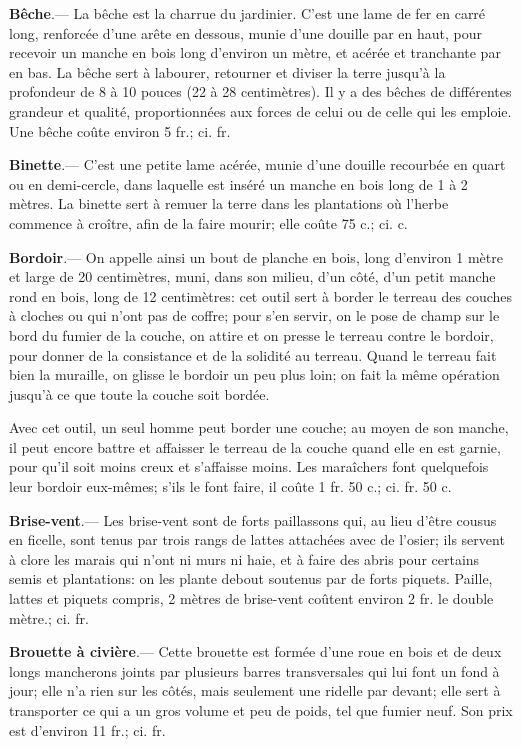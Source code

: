 \documentclass[10pt,a4paper]{book}
\begin{document}
\textbf{Bêche}.--- La bêche est la charrue du jardinier. C'est une lame de fer en carré long, renforcée d'une arête en dessous, munie d'une douille par en haut, pour recevoir un manche en bois long d'environ un mètre, et acérée et tranchante par en bas. La bêche sert à labourer, retourner et diviser la terre jusqu'à la profondeur de 8 à 10 pouces (22 à 28 centimètres). Il y a des bêches de différentes grandeur et qualité, proportionnées aux forces de celui ou de celle qui les emploie. Une bêche coûte environ 5 fr.; ci. fr.

\textbf{Binette}.--- C'est une petite lame acérée, munie d'une douille recourbée en quart ou en demi-cercle, dans laquelle est inséré un manche en bois long de 1 à 2 mètres. La binette sert à remuer la terre dans les plantations où l'herbe commence à croître, afin de la faire mourir; elle coûte 75 c.; ci. c.

\textbf{Bordoir}.--- On appelle ainsi un bout de planche en bois, long d'environ 1 mètre et large de 20 centimètres, muni, dans son milieu, d'un côté, d'un petit manche rond en bois, long de 12 centimètres: cet outil sert à border le terreau des couches à cloches ou qui n'ont pas de coffre; pour s'en servir, on le pose de champ sur le bord du fumier de la couche, on attire et on presse le terreau contre le bordoir, pour donner de la consistance et de la solidité au terreau. Quand le terreau fait bien la muraille, on glisse le bordoir un peu plus loin; on fait la même opération jusqu'à ce que toute la couche soit bordée.

Avec cet outil, un seul homme peut border une couche; au moyen de son manche, il peut encore battre et affaisser le terreau de la couche quand elle en est garnie, pour qu'il soit moins creux et s'affaisse moins. Les maraîchers font quelquefois leur bordoir eux-mêmes; s'ils le font faire, il coûte 1 fr. 50 c.; ci.  fr. 50 c.

\textbf{Brise-vent}.--- Les brise-vent sont de forts paillassons qui, au lieu d'être cousus en ficelle, sont tenus par trois rangs de lattes attachées avec de l'osier; ils servent à clore les marais qui n'ont ni murs ni haie, et à faire des abris pour certains semis et plantations: on les plante debout soutenus par de forts piquets. Paille, lattes et piquets compris, 2 mètres de brise-vent coûtent environ 2 fr. le double mètre.; ci. fr.

\textbf{Brouette à civière}.--- Cette brouette est formée d'une roue en bois et de deux longs mancherons joints par plusieurs barres transversales qui lui font un fond à jour; elle n'a rien sur les côtés, mais seulement une ridelle par devant; elle sert à transporter ce qui a un gros volume et peu de poids, tel que fumier neuf. Son prix est d'environ 11 fr.; ci. fr.
\end{document}
